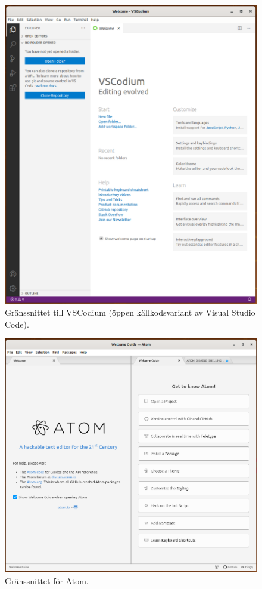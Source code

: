 \begin{frame}
  \begin{figure}
    \centering
    \includegraphics[height=0.8\textheight]{figs/codium.png}
    \caption{Gränssnittet till VSCodium (öppen källkodsvariant av Visual Studio 
    Code).}
  \end{figure}
\end{frame}

\begin{frame}
  \begin{figure}
    \centering
    \includegraphics[height=0.8\textheight]{figs/atom.png}
    \caption{Gränssnittet för Atom.}
  \end{figure}
\end{frame}


